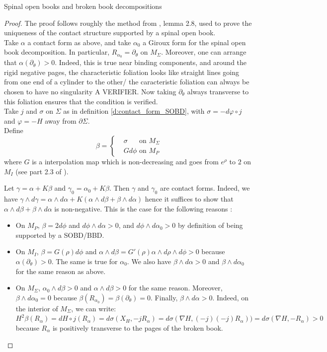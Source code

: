 \documentclass[../main.tex]{subfiles}
\begin{document}
\begin{section}{Spinal open books and broken book decompositions}
\begin{proof}
The proof follows roughly the method from \cite{SOBD1}, lemma 2.8, used to prove the uniqueness of the contact structure supported by a spinal open book. \\
Take $\alpha$ a contact form as above, and take $\alpha_0$ a Giroux form for the spinal open book decomposition. In particular, $R_{\alpha_0} = \partial_\theta$ on $M_\Sigma$. Moreover, one can arrange that $\alpha(\partial_\theta) >0$. Indeed, this is true near binding components, and around the rigid negative pages, the \color{red}characteristic foliation looks like straight lines going from one end of a cylinder to the other/ the caracteristic foliation can always be chosen to have no singularity A VERIFIER\color{black}. Now taking $\partial_\theta$ always transverse to this foliation ensures that the condition is verified. \\
Take $j$ and $\sigma$ on $\Sigma$ as in definition \ref{d:contact_form_SOBD}, with $\sigma = -d\varphi\circ j $ and $\varphi = -H$ away from $\partial \Sigma$. \\
Define $$\beta =
\left\{\begin{array}{ll}
&\sigma \,\,\,\;\;\;\mbox{   on  } M_\Sigma\\
&Gd\phi \mbox{ on } M_P
\end{array}\right.$$
where $G$ is a interpolation map which is non-decreasing and goes from $e^\rho$ to $2$ on $M_I$ (see part 2.3 of \cite{SOBD1}).

Let $\gamma = \alpha + K\beta$ and $\gamma_0 = \alpha_0 + K\beta$. Then $\gamma$ and $\gamma_0$ are contact forms. Indeed, we have $\gamma\wedge d\gamma = \alpha\wedge d\alpha + K(\alpha\wedge d\beta + \beta\wedge d\alpha)$ hence it suffices to show that $\alpha\wedge d\beta + \beta \wedge d\alpha $ is non-negative. This is the case for the following reasons :
\begin{itemize}
    \item On $M_P$, $\beta = 2d\phi$ and $d\phi\wedge d\alpha > 0$, and $d\phi\wedge d\alpha_0> 0$ by definition of being supported by a SOBD/BBD.
    \item On $M_I$, $\beta = G(\rho)d\phi$ and $\alpha\wedge d\beta = G'(\rho)\alpha\wedge d\rho\wedge d\phi > 0$ because $\alpha(\partial_\theta)> 0$. The same is true for $\alpha_0$. We also have $\beta\wedge d\alpha > 0$ and $\beta\wedge d\alpha_0$ for the same reason as above.
    \item On $M_\Sigma$, $\alpha_0\wedge d\beta>0$ and $\alpha\wedge d\beta> 0$ for the same reason. Moreover, $\beta\wedge d\alpha_0 = 0$ because $\beta(R_{\alpha_0}) = \beta(\partial_\theta) = 0$. Finally, $\beta\wedge d\alpha > 0$. Indeed, on the interior of $M_\Sigma$, we can write: $ H^2\beta(R_\alpha) = dH\circ j(R_\alpha) = d\sigma(X_H,-jR_\alpha) = d\sigma(\nabla H ,(-j)(-j)R_\alpha)) = d\sigma(\nabla H,-R_\alpha) > 0$ because $R_\alpha$ is positively transverse to the pages of the broken book.
\end{itemize}


\end{proof}
\end{section}
\end{document}
